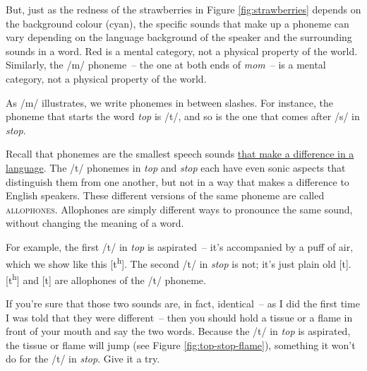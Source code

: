 But, just as the redness of the strawberries in Figure \ref{fig:strawberries} depends on the background colour (cyan), the specific sounds that make up a phoneme can vary depending on the language background of the speaker and the surrounding sounds in a word. Red is a mental category, not a physical property of the world. Similarly, the /m/ phoneme~-- the one at both ends of \textit{mom}~-- is a mental category, not a physical property of the world.

As /m/ illustrates, we write phonemes in between slashes. For instance, the phoneme that starts the word \textit{top} is /t/, and so is the one that comes after /s/ in \textit{stop}. 

Recall that phonemes are the smallest speech sounds \uline{that make a difference in a language}. The /t/ phonemes in \textit{top} and \textit{stop} each have even sonic aspects that distinguish them from one another, but not in a way that makes a difference to English speakers.  These different versions of the same phoneme are called \textsc{allophones}. Allophones are simply different ways to pronounce the same sound, without changing the meaning of a word.

For example, the first /t/ in  \textit{top} is aspirated~-- it's accompanied by a puff of air, which we show like this [t\textsuperscript{h}]. The second /t/ in \textit{stop} is not; it's just plain old [t]. [t\textsuperscript{h}] and [t] are allophones of the /t/ phoneme.

If you're sure that those two sounds are, in fact, identical~-- as I did the first time I was told that they were different~-- then you should hold a tissue or a flame in front of your mouth and say the two words. Because the /t/ in \textit{top} is aspirated, the tissue or flame will jump (see Figure \ref{fig:top-stop-flame}), something it won't do for the /t/ in \textit{stop}. Give it a try.

